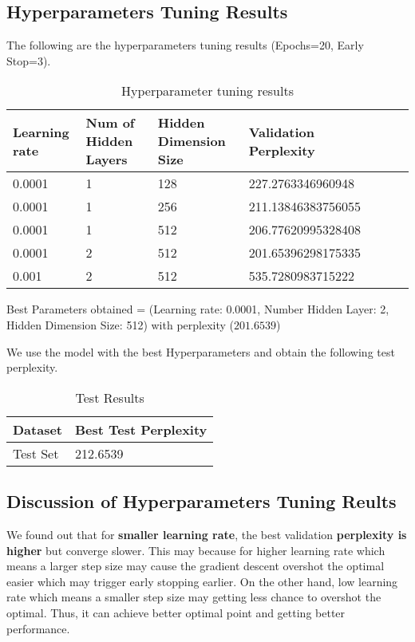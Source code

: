 \documentclass{article}
\begin{document}
\subsection{Hyperparameters Tuning Results}
The following are the hyperparameters tuning results (Epochs=20, Early Stop=3).

\begin{table}[htb]
	\caption{Hyperparameter tuning results}
	\label{sample-table}
	\centering
	\begin{tabular}{lllllll}
		\toprule
		\cmidrule{1-4}
		Learning rate & Num of Hidden Layers & Hidden Dimension Size & Validation Perplexity\\
		\midrule
		0.0001 & 1 & 128 & 227.2763346960948 \\
		0.0001 & 1  & 256 & 211.13846383756055  \\
		0.0001 & 1  & 512 & 206.77620995328408  \\
		0.0001 & 2 & 512 & 201.65396298175335  \\
		0.001 & 2  & 512 & 535.7280983715222  \\
		\bottomrule
	\end{tabular}
\end{table}

Best Parameters obtained = (Learning rate: 0.0001, Number Hidden Layer: 2, Hidden Dimension Size: 512) with perplexity ($201.6539$)

We use the model with the best Hyperparameters and obtain the following test perplexity.

\pagebreak

\begin{table}[htb]
	\caption{Test Results}
	\label{sample-table}
	\centering
	\begin{tabular}{ll}
		\toprule
		\cmidrule{1-2}
		Dataset & Best Test Perplexity\\
		\midrule
		Test Set & 212.6539  \\
		\bottomrule
	\end{tabular}
\end{table}

\subsection{Discussion of Hyperparameters Tuning Reults}

We found out that for \textbf{smaller learning rate}, the best validation \textbf{perplexity is higher} but converge slower. This may because for higher learning rate which means a larger step size may cause the gradient descent overshot the optimal easier which may trigger early stopping earlier. On the other hand, low learning rate which means a smaller step size may getting less chance to overshot the optimal. Thus, it can achieve better optimal point and getting better performance.
\end{document}
